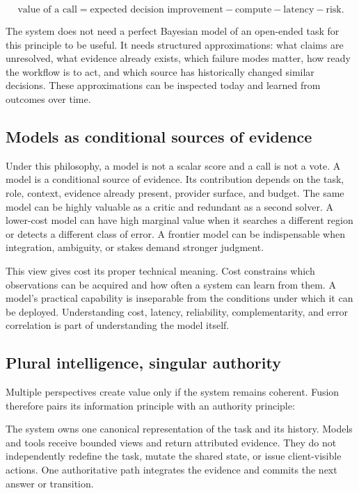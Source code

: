\begin{equation}
  \text{value of a call}
  = \text{expected decision improvement}
  - \text{compute} - \text{latency} - \text{risk}.
\end{equation}

The system does not need a perfect Bayesian model of an open-ended task for
this principle to be useful. It needs structured approximations: what claims
are unresolved, what evidence already exists, which failure modes matter, how
ready the workflow is to act, and which source has historically changed similar
decisions. These approximations can be inspected today and learned from
outcomes over time.

\subsection{Models as conditional sources of evidence}

Under this philosophy, a model is not a scalar score and a call is not a vote.
A model is a conditional source of evidence. Its contribution depends on the
task, role, context, evidence already present, provider surface, and budget.
The same model can be highly valuable as a critic and redundant as a second
solver. A lower-cost model can have high marginal value when it searches a
different region or detects a different class of error. A frontier model can
be indispensable when integration, ambiguity, or stakes demand stronger
judgment.

This view gives cost its proper technical meaning. Cost constrains which
observations can be acquired and how often a system can learn from them. A
model's practical capability is inseparable from the conditions under which it
can be deployed. Understanding cost, latency, reliability, complementarity,
and error correlation is part of understanding the model itself.

\subsection{Plural intelligence, singular authority}

Multiple perspectives create value only if the system remains coherent.
Fusion therefore pairs its information principle with an authority principle:


The system owns one canonical representation of the task and its history.
Models and tools receive bounded views and return attributed evidence. They do
not independently redefine the task, mutate the shared state, or issue
client-visible actions. One authoritative path integrates the evidence and
commits the next answer or transition.

